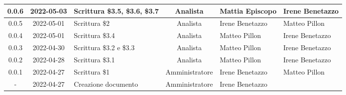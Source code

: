 \begin{center}
\begin{longtable}{ |c|c|p{8em}|c|m{5em}|m{5em}| }
    \hline
    0.0.6 & 2022-05-03 & Scrittura \newline \$3.5, \$3.6, \$3.7 & Analista & Mattia \newline Episcopo & Irene \newline Benetazzo\\
	\hline
    0.0.5 & 2022-05-01 & Scrittura \$2 & Analista & Irene \newline Benetazzo & Matteo \newline Pillon\\
	\hline
    0.0.4 & 2022-05-01 & Scrittura \$3.4 & Analista & Matteo \newline Pillon & Irene \newline Benetazzo\\
	\hline
    0.0.3 & 2022-04-30 & Scrittura \newline \$3.2 e \$3.3 & Analista & Matteo \newline Pillon & Irene \newline Benetazzo\\
	\hline
    0.0.2 & 2022-04-28 & Scrittura \$3.1 & Analista & Matteo \newline Pillon & Irene \newline Benetazzo\\
	\hline
	0.0.1 & 2022-04-27 & Scrittura \$1 & Amministratore & Irene \newline Benetazzo & Matteo \newline Pillon\\
	\hline
	- & 2022-04-27 & Creazione \newline documento & Amministratore & Irene \newline Benetazzo & \\
	\hline
	\end{longtable}
	\end{center}
	\newpage